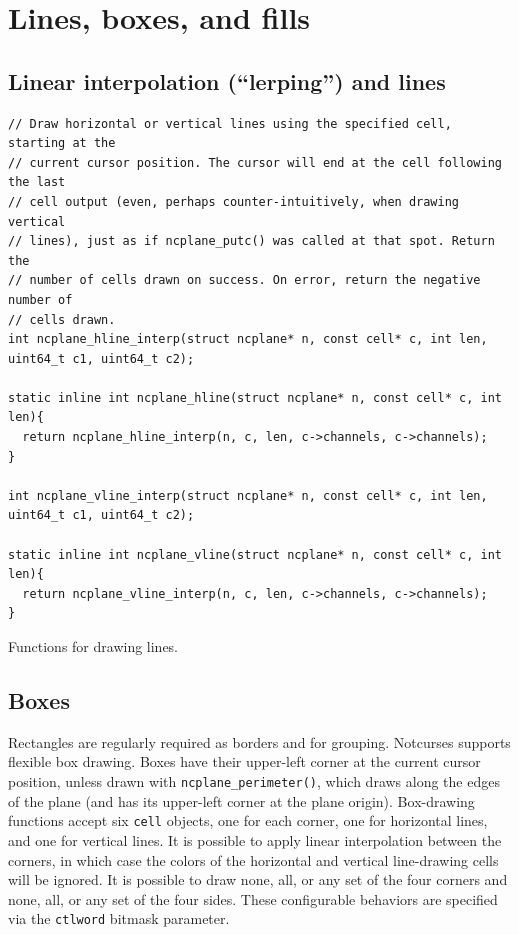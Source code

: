 \documentclass[letterpaper,10pt]{article}
\begin{document}
\cleardoublepage

\cleardoublepage


\cleardoublepage

\section{Lines, boxes, and fills}
\subsection{Linear interpolation (``lerping'') and lines}
\label{sec:lerps}
\begin{listing}[!htb]
\begin{verbatim}
// Draw horizontal or vertical lines using the specified cell, starting at the
// current cursor position. The cursor will end at the cell following the last
// cell output (even, perhaps counter-intuitively, when drawing vertical
// lines), just as if ncplane_putc() was called at that spot. Return the
// number of cells drawn on success. On error, return the negative number of
// cells drawn.
int ncplane_hline_interp(struct ncplane* n, const cell* c, int len, uint64_t c1, uint64_t c2);

static inline int ncplane_hline(struct ncplane* n, const cell* c, int len){
  return ncplane_hline_interp(n, c, len, c->channels, c->channels);
}

int ncplane_vline_interp(struct ncplane* n, const cell* c, int len, uint64_t c1, uint64_t c2);

static inline int ncplane_vline(struct ncplane* n, const cell* c, int len){
  return ncplane_vline_interp(n, c, len, c->channels, c->channels);
}
\end{verbatim}
\caption{Functions for drawing lines.}
\label{list:lines}
\end{listing}

\subsection{Boxes}
\label{sec:boxes}
Rectangles are regularly required as borders and for grouping. Notcurses supports
flexible box drawing. Boxes have their upper-left corner at the current cursor
position, unless drawn with \texttt{ncplane\_perimeter()}, which draws along the
edges of the plane (and has its upper-left corner at the plane origin). Box-drawing
functions accept six \texttt{cell} objects, one for each corner, one for horizontal
lines, and one for vertical lines. It is possible to apply linear interpolation
between the corners, in which case the colors of the horizontal and vertical
line-drawing cells will be ignored. It is possible to draw none, all, or any set
of the four corners and none, all, or any set of the four sides. These configurable
behaviors are specified via the \texttt{ctlword} bitmask parameter.
\end{document}
